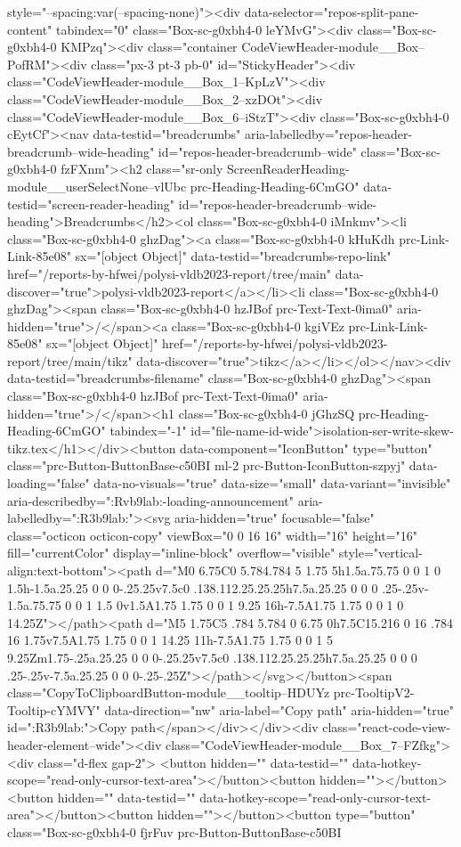 {{{{{{{{{{{{{{{{{{{{{{{{{{{{{style="--spacing:var(--spacing-none)"><div data-selector="repos-split-pane-content" tabindex="0" class="Box-sc-g0xbh4-0 leYMvG"><div class="Box-sc-g0xbh4-0 KMPzq"><div class="container CodeViewHeader-module__Box--PofRM"><div class="px-3 pt-3 pb-0" id="StickyHeader"><div class="CodeViewHeader-module__Box_1--KpLzV"><div class="CodeViewHeader-module__Box_2--xzDOt"><div class="CodeViewHeader-module__Box_6--iStzT"><div class="Box-sc-g0xbh4-0 cEytCf"><nav data-testid="breadcrumbs" aria-labelledby="repos-header-breadcrumb--wide-heading" id="repos-header-breadcrumb--wide" class="Box-sc-g0xbh4-0 fzFXnm"><h2 class="sr-only ScreenReaderHeading-module__userSelectNone--vlUbc prc-Heading-Heading-6CmGO" data-testid="screen-reader-heading" id="repos-header-breadcrumb--wide-heading">Breadcrumbs</h2><ol class="Box-sc-g0xbh4-0 iMnkmv"><li class="Box-sc-g0xbh4-0 ghzDag"><a class="Box-sc-g0xbh4-0 kHuKdh prc-Link-Link-85e08" sx="[object Object]" data-testid="breadcrumbs-repo-link" href="/reports-by-hfwei/polysi-vldb2023-report/tree/main" data-discover="true">polysi-vldb2023-report</a></li><li class="Box-sc-g0xbh4-0 ghzDag"><span class="Box-sc-g0xbh4-0 hzJBof prc-Text-Text-0ima0" aria-hidden="true">/</span><a class="Box-sc-g0xbh4-0 kgiVEz prc-Link-Link-85e08" sx="[object Object]" href="/reports-by-hfwei/polysi-vldb2023-report/tree/main/tikz" data-discover="true">tikz</a></li></ol></nav><div data-testid="breadcrumbs-filename" class="Box-sc-g0xbh4-0 ghzDag"><span class="Box-sc-g0xbh4-0 hzJBof prc-Text-Text-0ima0" aria-hidden="true">/</span><h1 class="Box-sc-g0xbh4-0 jGhzSQ prc-Heading-Heading-6CmGO" tabindex="-1" id="file-name-id-wide">isolation-ser-write-skew-tikz.tex</h1></div><button data-component="IconButton" type="button" class="prc-Button-ButtonBase-c50BI ml-2 prc-Button-IconButton-szpyj" data-loading="false" data-no-visuals="true" data-size="small" data-variant="invisible" aria-describedby=":Rvb9lab:-loading-announcement" aria-labelledby=":R3b9lab:"><svg aria-hidden="true" focusable="false" class="octicon octicon-copy" viewBox="0 0 16 16" width="16" height="16" fill="currentColor" display="inline-block" overflow="visible" style="vertical-align:text-bottom"><path d="M0 6.75C0 5.784.784 5 1.75 5h1.5a.75.75 0 0 1 0 1.5h-1.5a.25.25 0 0 0-.25.25v7.5c0 .138.112.25.25.25h7.5a.25.25 0 0 0 .25-.25v-1.5a.75.75 0 0 1 1.5 0v1.5A1.75 1.75 0 0 1 9.25 16h-7.5A1.75 1.75 0 0 1 0 14.25Z"></path><path d="M5 1.75C5 .784 5.784 0 6.75 0h7.5C15.216 0 16 .784 16 1.75v7.5A1.75 1.75 0 0 1 14.25 11h-7.5A1.75 1.75 0 0 1 5 9.25Zm1.75-.25a.25.25 0 0 0-.25.25v7.5c0 .138.112.25.25.25h7.5a.25.25 0 0 0 .25-.25v-7.5a.25.25 0 0 0-.25-.25Z"></path></svg></button><span class="CopyToClipboardButton-module__tooltip--HDUYz prc-TooltipV2-Tooltip-cYMVY" data-direction="nw" aria-label="Copy path" aria-hidden="true" id=":R3b9lab:">Copy path</span></div></div><div class="react-code-view-header-element--wide"><div class="CodeViewHeader-module__Box_7--FZfkg"><div class="d-flex gap-2"> <button hidden="" data-testid="" data-hotkey-scope="read-only-cursor-text-area"></button><button hidden=""></button><button hidden="" data-testid="" data-hotkey-scope="read-only-cursor-text-area"></button><button hidden=""></button><button type="button" class="Box-sc-g0xbh4-0 fjrFuv prc-Button-ButtonBase-c50BI }}}}}}}}}}}}}}}}}}}}}}}}}}}}}
